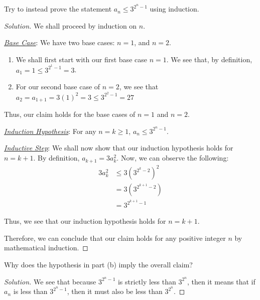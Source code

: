 \documentclass[openany]{book}
\newenvironment{solution}{\begin{proof}[Solution]}{\end{proof}}
\begin{document}
\begin{hw}
	Try to instead prove the statement $a_{n} \leq 3^{2^{n}-1}$ using induction.
\end{hw}
\begin{solution}
	We shall proceed by induction on $n$.
	
	\underline{\textit{Base Case}}: We have two base cases: $n=1$, and $n=2$.
	\begin{enumerate}
		\item 	We shall first start with our first base case $n=1$. We see that, by definition, $a_{1}=1 \leq 3^{2^{1}-1} = 3$.
		
		\item For our second base case of $n=2$, we see that $a_{2}=a_{1+1}=3\left( 1 \right)^{2}=3 \leq 3^{2^{2}-1}=27$ 
	\end{enumerate}

	Thus, our claim holds for the base cases of $n=1$ and $n=2$.
	
	\underline{\textit{Induction Hypothesis}}: For any $n=k\geq 1$, $a_{n} \leq 3^{2^{n}-1}$.
	
	\underline{\textit{Inductive Step}}: We shall now show that our induction hypothesis holds for $n=k+1$. By definition, $a_{k+1}=3a_{k}^{2}$. Now, we can observe the following:
	\begin{align*}
		3a^{2}_{k} &\leq 3\left( 3^{2^{k}-2} \right)^{2} \\
		&= 3\left( 3^{2^{k+1}-2} \right) \\
		&= 3^{2^{k+1}-1}
	\end{align*}

	Thus, we see that our induction hypothesis holds for $n=k+1$.
	
	Therefore, we can conclude that our claim holds for any positive integer $n$ by mathematical induction.
\end{solution}

\begin{hw}
	Why does the hypothesis in part (b) imply the overall claim?
\end{hw}
\begin{solution}
	We see that because $3^{2^{n}-1}$ is strictly less than $3^{2^{n}}$, then it means that if $a_{n}$ is less than $3^{2^{n}-1}$, then it must also be less than $3^{2^{n}}$.
\end{solution}
\end{document}
